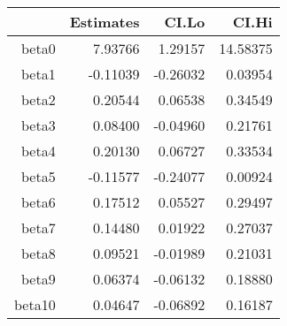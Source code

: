 \begin{table}[ht]
\centering
\begin{tabular}{rrrr}
  \hline
 & Estimates & CI.Lo & CI.Hi \\ 
  \hline
beta0 & 7.93766 & 1.29157 & 14.58375 \\ 
  beta1 & -0.11039 & -0.26032 & 0.03954 \\ 
  beta2 & 0.20544 & 0.06538 & 0.34549 \\ 
  beta3 & 0.08400 & -0.04960 & 0.21761 \\ 
  beta4 & 0.20130 & 0.06727 & 0.33534 \\ 
  beta5 & -0.11577 & -0.24077 & 0.00924 \\ 
  beta6 & 0.17512 & 0.05527 & 0.29497 \\ 
  beta7 & 0.14480 & 0.01922 & 0.27037 \\ 
  beta8 & 0.09521 & -0.01989 & 0.21031 \\ 
  beta9 & 0.06374 & -0.06132 & 0.18880 \\ 
  beta10 & 0.04647 & -0.06892 & 0.16187 \\ 
   \hline
\end{tabular}
\end{table}
